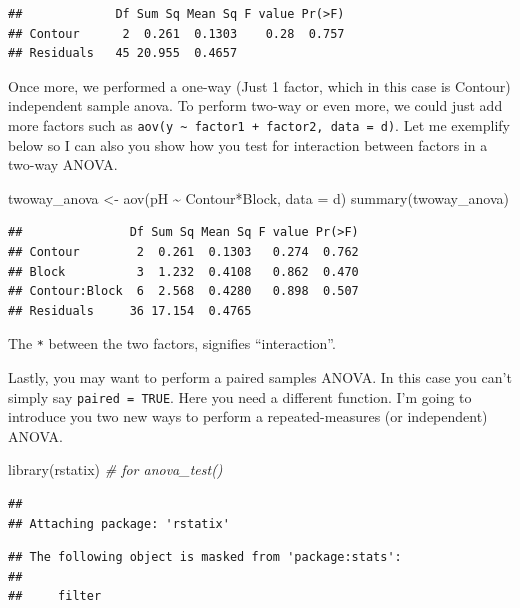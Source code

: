 \documentclass[
]{book}
\newenvironment{Shaded}{\begin{snugshade}}{\end{snugshade}}
\newcommand{\AttributeTok}[1]{\textcolor[rgb]{0.77,0.63,0.00}{#1}}
\newcommand{\CommentTok}[1]{\textcolor[rgb]{0.56,0.35,0.01}{\textit{#1}}}
\newcommand{\FunctionTok}[1]{\textcolor[rgb]{0.00,0.00,0.00}{#1}}
\newcommand{\NormalTok}[1]{#1}
\newcommand{\OtherTok}[1]{\textcolor[rgb]{0.56,0.35,0.01}{#1}}
\newcommand{\SpecialCharTok}[1]{\textcolor[rgb]{0.00,0.00,0.00}{#1}}
\begin{document}
\begin{verbatim}
##             Df Sum Sq Mean Sq F value Pr(>F)
## Contour      2  0.261  0.1303    0.28  0.757
## Residuals   45 20.955  0.4657
\end{verbatim}

Once more, we performed a one-way (Just 1 factor, which in this case is Contour) independent sample anova. To perform two-way or even more, we could just add more factors such as \texttt{aov(y\ \textasciitilde{}\ factor1\ +\ factor2,\ data\ =\ d)}. Let me exemplify below so I can also you show how you test for interaction between factors in a two-way ANOVA.

\begin{Shaded}
\begin{Highlighting}[]
\NormalTok{twoway\_anova }\OtherTok{\textless{}{-}} \FunctionTok{aov}\NormalTok{(pH }\SpecialCharTok{\textasciitilde{}}\NormalTok{ Contour}\SpecialCharTok{*}\NormalTok{Block, }\AttributeTok{data =}\NormalTok{ d)}
\FunctionTok{summary}\NormalTok{(twoway\_anova)}
\end{Highlighting}
\end{Shaded}

\begin{verbatim}
##               Df Sum Sq Mean Sq F value Pr(>F)
## Contour        2  0.261  0.1303   0.274  0.762
## Block          3  1.232  0.4108   0.862  0.470
## Contour:Block  6  2.568  0.4280   0.898  0.507
## Residuals     36 17.154  0.4765
\end{verbatim}

The \texttt{*} between the two factors, signifies ``interaction''.

Lastly, you may want to perform a paired samples ANOVA. In this case you can't simply say \texttt{paired\ =\ TRUE}. Here you need a different function. I'm going to introduce you two new ways to perform a repeated-measures (or independent) ANOVA.

\begin{Shaded}
\begin{Highlighting}[]
\FunctionTok{library}\NormalTok{(rstatix)  }\CommentTok{\# for anova\_test()}
\end{Highlighting}
\end{Shaded}

\begin{verbatim}
## 
## Attaching package: 'rstatix'
\end{verbatim}

\begin{verbatim}
## The following object is masked from 'package:stats':
## 
##     filter
\end{verbatim}
\end{document}
